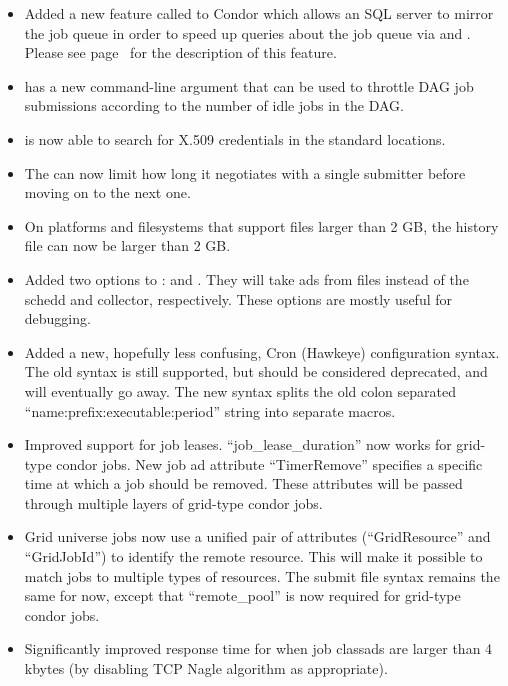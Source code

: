 \begin{itemize}

\item Added a new feature called  to Condor which allows an
        SQL server to mirror the job queue in order to speed up queries about
        the job queue via  and . Please see 
        page~\pageref{sec:Quill} for the description of this feature.

\item {} has a new  command-line argument
that can be used to throttle DAG job submissions according to the number
of idle jobs in the DAG.

\item {} is now able to search for X.509 credentials in the
standard locations.

\item The  can now limit how long it negotiates with a 
single submitter before moving on to the next one. 

\item On platforms and filesystems that support files larger than 2
GB, the history file can now be larger than 2 GB.

\item Added two options to :  and
  . They will take ads from files instead of the
  schedd and collector, respectively. These options are mostly useful
  for debugging. 

\item Added a new, hopefully less confusing, Cron (Hawkeye)
configuration syntax.  The old syntax is still supported, but should
be considered deprecated, and will eventually go away.  The new syntax
splits the old colon separated ``name:prefix:executable:period''
string into separate macros.

\item Improved support for job leases. ``job\_lease\_duration''  now works for
grid-type condor jobs. New job ad attribute ``TimerRemove'' specifies a
specific time at which a job should be removed. These attributes will be 
passed through multiple layers of grid-type condor jobs.

\item Grid universe jobs now use a unified pair of attributes 
(``GridResource'' and ``GridJobId'') to identify the remote resource. This
will make it possible to match jobs to multiple types of resources. The
submit file syntax remains the same for now, except that ``remote\_pool'' is
now required for grid-type condor jobs.

\item Significantly improved response time for  when job classads
are larger than 4 kbytes (by disabling TCP Nagle algorithm as appropriate).

\end{itemize}

